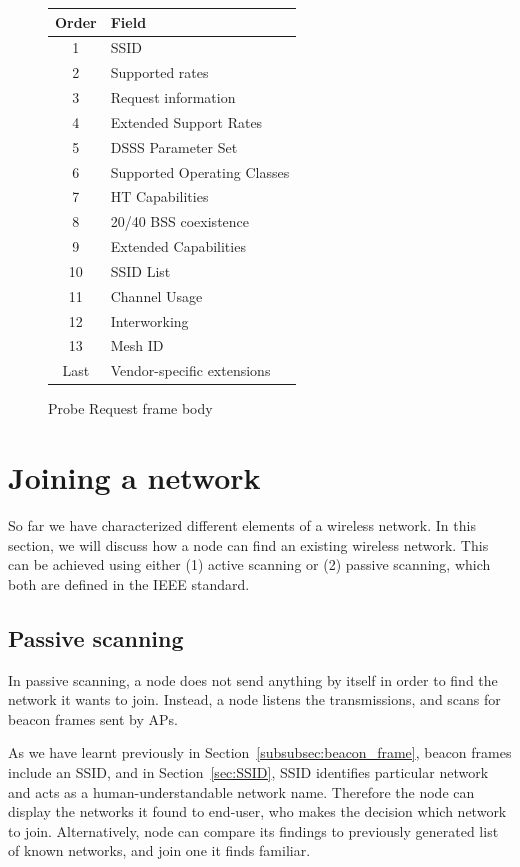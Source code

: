 \documentclass[12pt,a4paper,oneside,pdftex]{report}
\begin{document}
\begin{figure}
\center
\label{fig:probe_request}
\begin{tabular}{|c|l|}
    \hline
    Order & Field \\ \hline
    \hline
    1 & SSID \\ \hline
    2 & Supported rates \\ \hline
    3 & Request information \\ \hline
    4 & Extended Support Rates \\ \hline
    5 & DSSS Parameter Set \\ \hline
    6 & Supported Operating Classes \\ \hline
    7 & HT Capabilities \\ \hline
    8 & 20/40 BSS coexistence \\ \hline
    9 & Extended Capabilities \\ \hline
    10 & SSID List \\ \hline
    11 & Channel Usage \\ \hline
    12 & Interworking \\ \hline
    13 & Mesh ID \\ \hline
    Last & Vendor-specific extensions \\ \hline
\end{tabular}
\caption{Probe Request frame body}
\end{figure}

\section{Joining a network}
\label{sec:joining}

So far we have characterized different elements of a wireless network. In this section, we will discuss how a node can find an existing wireless network. This can be achieved using either (1) active scanning or (2) passive scanning, which both are defined in the IEEE standard.~\cite{IEEE802.11_scanning}

\subsection{Passive scanning}
\label{subsec:passive_scanning}

In passive scanning, a node does not send anything by itself in order to find the network it wants to join. Instead, a node listens the transmissions, and scans for beacon frames sent by APs.

As we have learnt previously in Section~\ref{subsubsec:beacon_frame}, beacon frames include an SSID, and in Section~\ref{sec:SSID}, SSID identifies particular network and acts as a human-understandable network name. Therefore the node can display the networks it found to end-user, who makes the decision which network to join. Alternatively, node can compare its findings to previously generated list of known networks, and join one it finds familiar.
\end{document}
